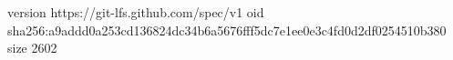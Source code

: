 version https://git-lfs.github.com/spec/v1
oid sha256:a9addd0a253cd136824dc34b6a5676fff5dc7e1ee0e3c4fd0d2df0254510b380
size 2602
